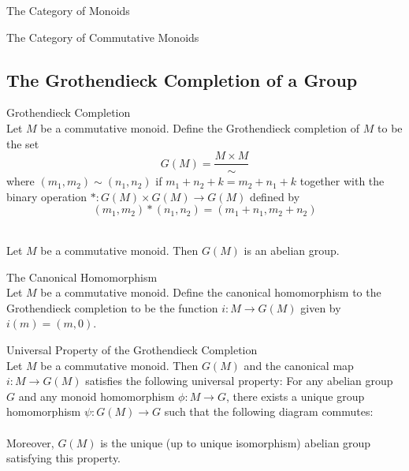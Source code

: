 \documentclass[a4paper]{article}
\begin{document}
\begin{defn}{The Category of Monoids}{}
\end{defn}

\begin{defn}{The Category of Commutative Monoids}{}
\end{defn}

\subsection{The Grothendieck Completion of a Group}
\begin{defn}{Grothendieck Completion}{}\\
Let $M$ be a commutative monoid. Define the Grothendieck completion of $M$ to be the set $$G(M)=\frac{M\times M}{\sim}$$ where $(m_1,m_2)\sim(n_1,n_2)$ if $m_1+n_2+k=m_2+n_1+k$ together with the binary operation $\ast:G(M)\times G(M)\to G(M)$ defined by $$(m_1,m_2)\ast(n_1,n_2)=(m_1+n_1,m_2+n_2)$$
\end{defn}

\begin{lmm}{}{}\\
Let $M$ be a commutative monoid. Then $G(M)$ is an abelian group. 
\end{lmm}

\begin{defn}{The Canonical Homomorphism}{}\\
Let $M$ be a commutative monoid. Define the canonical homomorphism to the Grothendieck completion to be the function $i:M\to G(M)$ given by $i(m)=(m,0)$. 
\end{defn}

\begin{prp}{Universal Property of the Grothendieck Completion}{}\\
Let $M$ be a commutative monoid. Then $G(M)$ and the canonical map $i:M\to G(M)$ satisfies the following universal property: For any abelian group $G$ and any monoid homomorphism $\phi:M\to G$, there exists a unique group homomorphism $\psi:G(M)\to G$ such that the following diagram commutes: \\
 \\
Moreover, $G(M)$ is the unique (up to unique isomorphism) abelian group satisfying this property. 
\end{prp}
\end{document}
